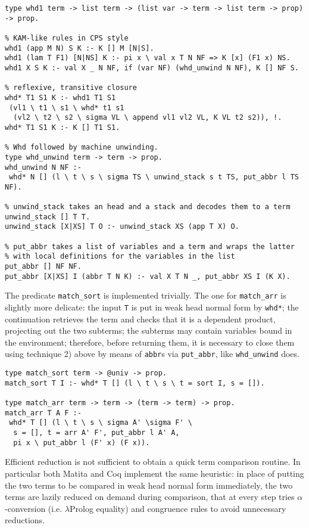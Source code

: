 \begin{Verbatim}
type whd1 term -> list term -> (list var -> term -> list term -> prop) -> prop.

% KAM-like rules in CPS style
whd1 (app M N) S K :- K [] M [N|S].
whd1 (lam T F1) [N|NS] K :- pi x \ val x T N NF => K [x] (F1 x) NS.
whd1 X S K :- val X _ N NF, if (var NF) (whd_unwind N NF), K [] NF S.

% reflexive, transitive closure
whd* T1 S1 K :- whd1 T1 S1
 (vl1 \ t1 \ s1 \ whd* t1 s1
  (vl2 \ t2 \ s2 \ sigma VL \ append vl1 vl2 VL, K VL t2 s2)), !.
whd* T1 S1 K :- K [] T1 S1.

% Whd followed by machine unwinding.
type whd_unwind term -> term -> prop.
whd_unwind N NF :-
 whd* N [] (l \ t \ s \ sigma TS \ unwind_stack s t TS, put_abbr l TS NF).

% unwind_stack takes an head and a stack and decodes them to a term
unwind_stack [] T T.
unwind_stack [X|XS] T O :- unwind_stack XS (app T X) O.

% put_abbr takes a list of variables and a term and wraps the latter
% with local definitions for the variables in the list
put_abbr [] NF NF.
put_abbr [X|XS] I (abbr T N K) :- val X T N _, put_abbr XS I (K X).
\end{Verbatim}

The predicate \verb+match_sort+ is implemented trivially. The one for \verb+match_arr+ is slightly more delicate: the input \verb+T+ is put in weak head normal form by \verb+whd*+; the continuation retrieves the term and checks that it is a dependent product, projecting out the two subterms; the subterms may contain variables bound in the environment; therefore, before returning them, it is necessary to close them using technique 2) above by means of \verb+abbr+s via \verb+put_abbr+, like \verb+whd_unwind+ does.

\begin{Verbatim}
type match_sort term -> @univ -> prop.
match_sort T I :- whd* T [] (l \ t \ s \ t = sort I, s = []).

type match_arr term -> term -> (term -> term) -> prop.
match_arr T A F :-
 whd* T [] (l \ t \ s \ sigma A' \sigma F' \
  s = [], t = arr A' F', put_abbr l A' A,
  pi x \ put_abbr l (F' x) (F x)).
\end{Verbatim}

Efficient reduction is not sufficient to obtain a quick term comparison
routine.  In particular both Matita and Coq implement the same heuristic: in
place of putting the two terms to be compared in weak head normal form
immediately, the two terms are lazily reduced on demand during comparison, that
at every step tries $\alpha$-conversion (i.e. $\lambda$Prolog equality) and
congruence rules to avoid unnecessary reductions.

